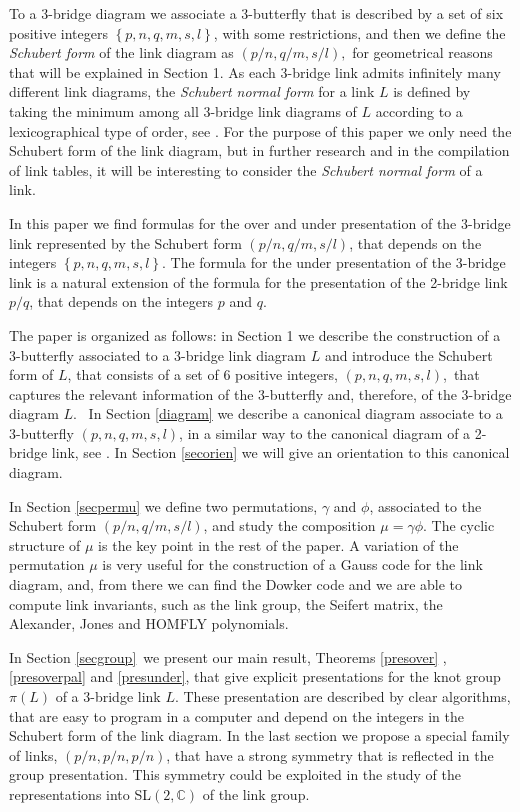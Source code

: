 \documentclass[12pt]{article}%
\begin{document}
To a 3-bridge diagram we associate a 3-butterfly that is described by a set of
six positive integers $\left\{  p,n,q,m,s,l\right\}  $, with some
restrictions, and then we define the \textit{Schubert form} of the link
diagram as $\left(  p/n,q/m,s/l\right)  ,$ for geometrical reasons that will
be explained in Section 1. As each 3-bridge link admits infinitely many
different link diagrams, the \textit{Schubert normal form }for a link $L$ is
defined by taking the minimum among all 3-bridge link diagrams of $L$
according to a lexicographical type of order, see \cite{HMTT4}. For the
purpose of this paper we only need the Schubert form of the link diagram, but
in further research and in the compilation of link tables, it will be
interesting to consider the \textit{Schubert normal form }of a link.

In this paper we find formulas for the over and under presentation of the
3-bridge link represented by the Schubert form $\left(  p/n,q/m,s/l\right)  $,
that depends on the integers $\left\{  p,n,q,m,s,l\right\}  $. The formula for
the under presentation of the 3-bridge link is a natural extension of the
formula for the presentation of the 2-bridge link $p/q$, that depends on the
integers $p$ and $q$.

The paper is organized as follows: in Section 1 we describe the construction
of a 3-butterfly associated to a 3-bridge link diagram $L$ and introduce the
Schubert form of $L$, that consists of a set of 6 positive integers, $\left(
p,n,q,m,s,l\right)  $,\ that captures the relevant information of the
3-butterfly and, therefore, of the 3-bridge diagram $L$. \ In Section
\ref{diagram} we describe a canonical diagram associate to a 3-butterfly
$\left(  p,n,q,m,s,l\right)  $, in a similar way to the canonical diagram of a
2-bridge link, see \cite{Sch}. In Section \ref{secorien} we will give an
orientation to this canonical diagram.

In Section \ref{secpermu} we define two permutations, $\gamma$ and $\phi$,
associated to the Schubert form $\left(  p/n,q/m,s/l\right)  $, and study the
composition $\mu=\gamma\phi$. The cyclic structure of $\mu$ is the key point
in the rest of the paper. A variation of the permutation $\mu$ is very useful
for the construction of a Gauss code for the link diagram, and, from there we
can find the Dowker code and we are able to compute link invariants, such as
the link group, the Seifert matrix, the Alexander, Jones and HOMFLY polynomials.

In Section \ref{secgroup}\ we present our main result, Theorems \ref{presover}%
, \ref{presoverpal} and \ref{presunder}, that give explicit presentations for
the knot group $\pi\left(  L\right)  $ of a $3$-bridge link $L$. These
presentation are described by clear algorithms, that are easy to program in a
computer and depend on the integers in the Schubert form of the link diagram.
In the last section we propose a special family of links, $\left(
p/n,p/n,p/n\right)  $, that have a strong symmetry that is reflected in the
group presentation. This symmetry could be exploited in the study of the
representations into SL$\left(  2,\mathbb{C}\right)  $ of the link group.
\end{document}
